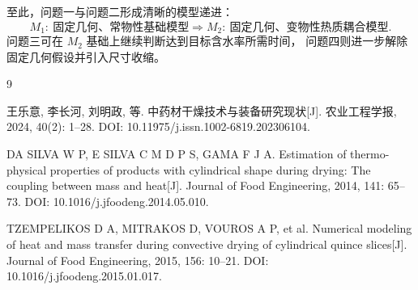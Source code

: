 \documentclass[UTF8,a4paper,11pt]{ctexart}
\begin{document}
至此，问题一与问题二形成清晰的模型递进：
\[
\boxed{
M_1:\ \text{固定几何、常物性基础模型}
}
\Longrightarrow
\boxed{
M_2:\ \text{固定几何、变物性热质耦合模型}
}.
\]
问题三可在 $M_2$ 基础上继续判断达到目标含水率所需时间，
问题四则进一步解除固定几何假设并引入尺寸收缩。

\begin{thebibliography}{9}

王乐意, 李长河, 刘明政, 等.
中药材干燥技术与装备研究现状[J].
农业工程学报, 2024, 40(2): 1--28.
DOI: 10.11975/j.issn.1002-6819.202306104.

DA SILVA W P, E SILVA C M D P S, GAMA F J A.
Estimation of thermo-physical properties of products with cylindrical shape during drying:
The coupling between mass and heat[J].
Journal of Food Engineering, 2014, 141: 65--73.
DOI: 10.1016/j.jfoodeng.2014.05.010.

TZEMPELIKOS D A, MITRAKOS D, VOUROS A P, et al.
Numerical modeling of heat and mass transfer during convective drying of cylindrical quince slices[J].
Journal of Food Engineering, 2015, 156: 10--21.
DOI: 10.1016/j.jfoodeng.2015.01.017.

\end{thebibliography}
\end{document}
